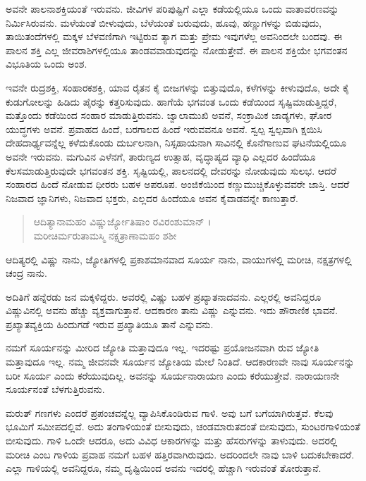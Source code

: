ಅವನೇ ಪಾಲನಾಶಕ್ತಿಯಂತೆ ಇರುವನು. ಜೀವಿಗಳ ಪರಿಪುಷ್ಟಿಗೆ ಎಲ್ಲಾ ಕಡೆಯಲ್ಲಿಯೂ ಒಂದು ವಾತಾವರಣವನ್ನು ನಿರ್ಮಿಸಿರುವನು. ಮಳೆಯಂತೆ ಬೀಳುವುದು, ಬೆಳೆಯಂತೆ ಬರುವುದು, ಹೂವು, ಹಣ್ಣುಗಳನ್ನು ಬಿಡುವುದು, ತಾಯಿತಂದೆಗಳಲ್ಲಿ ಮಕ್ಕಳ ಬೆಳವಣಿಗಾಗಿ ಇಟ್ಟಿರುವ ತ್ಯಾಗ ಮತ್ತು ಪ್ರೇಮ ಇವುಗಳೆಲ್ಲ ಅವನಿಂದಲೇ ಬಂದವು. ಈ ಪಾಲನ ಶಕ್ತಿ ಎಲ್ಲ ಜೀವರಾಶಿಗಳಲ್ಲಿಯೂ ತಾಂಡವವಾಡುವುದನ್ನು ನೋಡುತ್ತೇವೆ. ಈ ಪಾಲನ ಶಕ್ತಿಯೇ ಭಗವಂತನ ವಿಭೂತಿಯ ಒಂದು ಅಂಶ.

ಇವನೇ ರುದ್ರಶಕ್ತಿ, ಸಂಹಾರಕಶಕ್ತಿ, ಯಾವ ರೈತನ ಕೈ ಬೀಜಗಳನ್ನು ಬಿತ್ತುವುದೊ, ಕಳೆಗಳನ್ನು ಕೀಳುವುದೊ, ಅದೇ ಕೈ ಕುಡುಗೋಲನ್ನು ಹಿಡಿದು ಪೈರನ್ನು ಕತ್ತರಿಸುವುದು. ಹಾಗೆಯೆ ಭಗವಂತ ಒಂದು ಕಡೆಯಿಂದ ಸೃಷ್ಟಿಮಾಡುತ್ತಿದ್ದರೆ, ಮತ್ತೊಂದು ಕಡೆಯಿಂದ ಸಂಹಾರ ಮಾಡುತ್ತಿರುವನು. ಜ್ವಾಲಾಮುಖಿ ಅವನೆ, ಸಂಕ್ರಾಮಿಕ ಜಾಡ್ಯಗಳು, ಘೋರ ಯುದ್ಧಗಳು ಅವನೆ. ಪ್ರವಾಹದ ಹಿಂದೆ, ಬರಗಾಲದ ಹಿಂದೆ ಇರುವವನೂ ಅವನೆ. ಸ್ವಲ್ಪ ಸ್ವಲ್ಪವಾಗಿ ಕ್ಷಯಿಸಿ ದೇಹದಾರ್ಢ್ಯವನ್ನೆಲ್ಲ ಕಳೆದುಕೊಂಡು ದುರ್ಬಲನಾಗಿ, ನಿಸ್ಸಹಾಯನಾಗಿ ಸಾವಿನಲ್ಲಿ ಕೊನೆಗಾಣುವ ಘಟನೆಯಲ್ಲಿಯೂ ಅವನೇ ಇರುವನು. ಮಗುವಿನ ಎಳೆನಗೆ, ತಾರುಣ್ಯದ ಉತ್ಸಾಹ, ವೃದ್ಧಾಪ್ಯದ ವ್ಯಾಧಿ ಎಲ್ಲದರ ಹಿಂದೆಯೂ ಕೆಲಸಮಾಡುತ್ತಿರುವುದೇ ಭಗವಂತನ ಶಕ್ತಿ. ಸೃಷ್ಟಿಯಲ್ಲಿ, ಪಾಲನದಲ್ಲಿ ದೇವರನ್ನು ನೋಡುವುದು ಸುಲಭ. ಆದರೆ ಸಂಹಾರದ ಹಿಂದೆ ನೋಡುವ ಧೀರರು ಬಹಳ ಅಪರೂಪ. ಅಂಜಿಕೆಯಿಂದ ಕಣ್ಣುಮುಚ್ಚಿಕೊಳ್ಳುವವರೇ ಜಾಸ್ತಿ. ಆದರೆ ನಿಜವಾದ ಜ್ಞಾನಿಗಳು, ನಿಜವಾದ ಭಕ್ತರು, ಎಲ್ಲದರ ಹಿಂದೆಯೂ ಅವನ ಕೈವಾಡವನ್ನೇ ಕಾಣುತ್ತಾರೆ.

\begin{verse}
ಆದಿತ್ಯಾನಾಮಹಂ ವಿಷ್ಣುರ್ಜ್ಯೋತಿಷಾಂ ರವಿರಂಶುಮಾನ್ ।\\ಮರೀಚಿರ್ಮರುತಾಮಸ್ಮಿ ನಕ್ಷತ್ರಾಣಾಮಹಂ ಶಶೀ 
\end{verse}

{\small ಆದಿತ್ಯರಲ್ಲಿ ವಿಷ್ಣು ನಾನು, ಜ್ಯೋತಿಗಳಲ್ಲಿ ಪ್ರಕಾಶಮಾನವಾದ ಸೂರ್ಯ ನಾನು, ವಾಯುಗಳಲ್ಲಿ ಮರೀಚಿ, ನಕ್ಷತ್ರಗಳಲ್ಲಿ ಚಂದ್ರ ನಾನು.}

ಅದಿತಿಗೆ ಹನ್ನೆರಡು ಜನ ಮಕ್ಕಳಿದ್ದರು. ಅವರಲ್ಲಿ ವಿಷ್ಣು ಬಹಳ ಪ್ರಖ್ಯಾತನಾದವನು. ಎಲ್ಲರಲ್ಲಿ ಅವನಿದ್ದರೂ ವಿಷ್ಣುವಿನಲ್ಲಿ ಅವನು ಹೆಚ್ಚು ವ್ಯಕ್ತವಾಗುತ್ತಾನೆ. ಆದಕಾರಣ ತಾನು ವಿಷ್ಣು ಎನ್ನುವನು. ಇದು ಪೌರಾಣಿಕ ಭಾವನೆ. ಪ್ರಖ್ಯಾತವ್ಯಕ್ತಿಯ ಹಿಂದುಗಡೆ ಇರುವ ಪ್ರಖ್ಯಾತಿಯೂ ತಾನೆ ಎನ್ನುವನು.

ನಮಗೆ ಸೂರ್ಯನನ್ನು ಮೀರಿದ ಜ್ಯೋತಿ ಮತ್ತಾವುದೂ ಇಲ್ಲ. ಇದರಷ್ಟು ಪ್ರಯೋಜನವಾಗಿ ರುವ ಜ್ಯೋತಿ ಮತ್ತಾವುದೂ ಇಲ್ಲ. ನಮ್ಮ ಜೀವನವೇ ಸೂರ್ಯನ ಜ್ಯೋತಿಯ ಮೇಲೆ ನಿಂತಿದೆ. ಆದಕಾರಣವೇ ನಾವು ಸೂರ್ಯನನ್ನು ಬರೀ ಸೂರ್ಯ ಎಂದು ಕರೆಯುವುದಿಲ್ಲ. ಅವನನ್ನು ಸೂರ್ಯನಾರಾಯಣ ಎಂದು ಕರೆಯುತ್ತೇವೆ. ನಾರಾಯಣನೇ ಸೂರ್ಯನಂತೆ ಬೆಳಗುತ್ತಿರುವನು.

ಮರುತ್ ಗಣಗಳು ಎಂದರೆ ಪ್ರಪಂಚವನ್ನೆಲ್ಲ ವ್ಯಾಪಿಸಿಕೊಂಡಿರುವ ಗಾಳಿ. ಅವು ಬಗೆ ಬಗೆಯಾಗಿರುತ್ತವೆ. ಕೆಲವು ಭೂಮಿಗೆ ಸಮೀಪದಲ್ಲಿವೆ. ಅದು ತಂಗಾಳಿಯಂತೆ ಬೀಸುವುದು, ಚಂಡಮಾರುತದಂತೆ ಬೀಸುವುದು, ಸುಂಟರಗಾಳಿಯಂತೆ ಬೀಸುವುದು. ಗಾಳಿ ಒಂದೇ ಆದರೂ, ಅದು ವಿವಿಧ ಆಕಾರಗಳನ್ನು ಮತ್ತು ಹೆಸರುಗಳನ್ನು ತಾಳುವುದು. ಅದರಲ್ಲಿ ಮರೀಚಿ ಎಂಬ ಗಾಳಿಯ ಪ್ರವಾಹ ನಮಗೆ ಬಹಳ ಹತ್ತಿರವಾಗಿರುವುದು. ಅದರಿಂದಲೇ ನಾವು ಬಾಳಿ ಬದುಕಬೇಕಾದರೆ. ಎಲ್ಲಾ ಗಾಳಿಯಲ್ಲಿ ಅವನಿದ್ದರೂ, ನಮ್ಮ ದೃಷ್ಟಿಯಿಂದ ಅವನು ಇದರಲ್ಲಿ ಹೆಚ್ಚಾಗಿ ಇರುವಂತೆ ತೋರುತ್ತಾನೆ.

